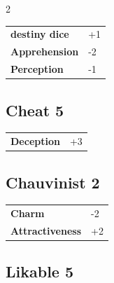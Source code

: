 \begin{multicols}{2}
\begin{tcolorbox}
\begin{tabular}{@{}ll@{}}
    \textbf{destiny dice} & +1\\
    \textbf{Apprehension} & -2\\
    \textbf{Perception} & -1\\
\end{tabular}


\end{tcolorbox}

\begin{tcolorbox}
    \subsection*{Cheat \hfill \small{5 }}
    \tcblower




\begin{tabular}{@{}ll@{}}
    \textbf{Deception} & +3\\
\end{tabular}


\end{tcolorbox}

\begin{tcolorbox}
    \subsection*{Chauvinist \hfill \small{2 }}
    \tcblower




\begin{tabular}{@{}ll@{}}
    \textbf{Charm} & -2\\
    \textbf{Attractiveness} & +2\\
\end{tabular}


\end{tcolorbox}

\begin{tcolorbox}
    \subsection*{Likable \hfill \small{5 }}
    \tcblower





\end{tcolorbox}
\end{multicols}
